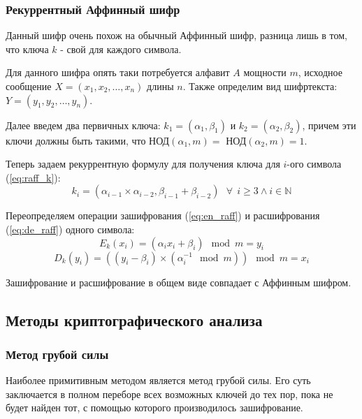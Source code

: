\documentclass[a4paper]{article}
\begin{document}
  \subsubsection{Рекуррентный Аффинный шифр}

  Данный шифр очень похож на обычный Аффинный шифр, разница лишь в том, что ключа $k$ - 
  свой для каждого символа.

  Для данного шифра опять таки потребуется алфавит $A$ мощности $m$, исходное сообщение 
  $X = (x_1, x_2, \dots, x_n)$ длины $n$. Также определим вид шифртекста: 
  $Y = (y_1, y_2, \dots, y_n)$.

  Далее введем два первичных ключа: $k_1 = (\alpha_1, \beta_1)$ и $k_2 = (\alpha_2, \beta_2)$, причем
  эти ключи должны быть такими, что НОД$(\alpha_1, m) = $ НОД$(\alpha_2, m) = 1$.

  Теперь задаем рекуррентную формулу для получения ключа для $i$-ого символа (\ref{eq:raff_k}):
  \begin{equation}
    k_i = (\alpha_{i - 1} \times \alpha_{i - 2}, \beta_{i - 1} + \beta_{i - 2}) \:\:\: \forall \:\: i \geq 3 \land i \in \mathbb{N}
    \label{eq:raff_k}
  \end{equation}

  Переопределяем операции зашифрования (\ref{eq:en_raff}) и расшифрования (\ref{eq:de_raff}) одного символа:
  \begin{equation}
    E_k(x_i) = (\alpha_ix_i + \beta_i)\mod{m} = y_i
    \label{eq:en_raff}
  \end{equation}
  \begin{equation}
    D_k(y_i) = ((y_i - \beta_i) \times (\alpha_i^{-1}\mod{m}))\mod{m} = x_i
    \label{eq:de_raff}
  \end{equation}

  Зашифрование и расшифрование в общем виде совпадает с Аффинным шифром.

  \subsection{Методы криптографического анализа}

  \subsubsection{Метод грубой силы}

  Наиболее примитивным методом является метод грубой силы. Его суть заключается в полном переборе всех
  возможных ключей до тех пор, пока не будет найден тот, с помощью которого производилось зашифрование.
\end{document}
